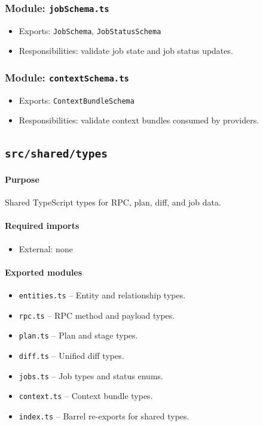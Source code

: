 \documentclass[11pt]{article}
\begin{document}
\subsubsection*{Module: \texttt{jobSchema.ts}}
\begin{itemize}[noitemsep]
  \item Exports: \texttt{JobSchema}, \texttt{JobStatusSchema}
  \item Responsibilities: validate job state and job status updates.
\end{itemize}

\subsubsection*{Module: \texttt{contextSchema.ts}}
\begin{itemize}[noitemsep]
  \item Exports: \texttt{ContextBundleSchema}
  \item Responsibilities: validate context bundles consumed by providers.
\end{itemize}

\subsection{\texttt{src/shared/types}}
\paragraph{Purpose} Shared TypeScript types for RPC, plan, diff, and job data.

\paragraph{Required imports}
\begin{itemize}[noitemsep]
  \item External: none
\end{itemize}

\paragraph{Exported modules}
\begin{itemize}[noitemsep]
  \item \texttt{entities.ts} -- Entity and relationship types.
  \item \texttt{rpc.ts} -- RPC method and payload types.
  \item \texttt{plan.ts} -- Plan and stage types.
  \item \texttt{diff.ts} -- Unified diff types.
  \item \texttt{jobs.ts} -- Job types and status enums.
  \item \texttt{context.ts} -- Context bundle types.
  \item \texttt{index.ts} -- Barrel re-exports for shared types.
\end{itemize}
\end{document}

